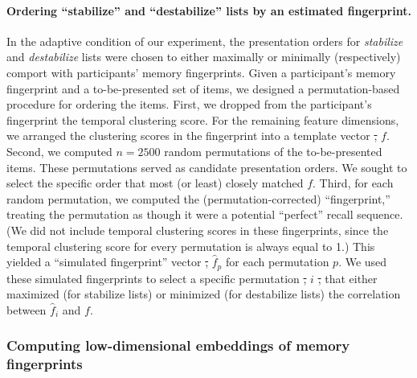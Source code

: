 \documentclass[11pt]{article}
\providecommand{\DIFdeltex}[1]{{\protect\color{red}\sout{#1}}}                      %
\providecommand{\DIFdelbegin}{} %
\providecommand{\DIFdelend}{} %
\providecommand{\DIFdel}[1]{\texorpdfstring{\DIFdeltex{#1}}{}} %
\newcommand{\DIFscaledelfig}{0.5}
\newlength{\DIFdelgraphicswidth} %
\newlength{\DIFdelgraphicsheight} %
\newcommand{\DIFdelincludegraphics}[2][]{%
\sbox{\DIFdelgraphicsbox}{\DIFOincludegraphics[#1]{#2}}%
\settoboxwidth{\DIFdelgraphicswidth}{\DIFdelgraphicsbox} %
\settoboxtotalheight{\DIFdelgraphicsheight}{\DIFdelgraphicsbox} %
\scalebox{\DIFscaledelfig}{%
\parbox[b]{\DIFdelgraphicswidth}{\usebox{\DIFdelgraphicsbox}\\[-\baselineskip] \rule{\DIFdelgraphicswidth}{0em}}\llap{\resizebox{\DIFdelgraphicswidth}{\DIFdelgraphicsheight}{%
\setlength{\unitlength}{\DIFdelgraphicswidth}%
\begin{picture}(1,1)%
\thicklines\linethickness{2pt} %
{\color[rgb]{1,0,0}\put(0,0){\framebox(1,1){}}}%
{\color[rgb]{1,0,0}\put(0,0){\line( 1,1){1}}}%
{\color[rgb]{1,0,0}\put(0,1){\line(1,-1){1}}}%
\end{picture}%
}\hspace*{3pt}}} %
} %
\DeclareRobustCommand{\DIFdelbegin}{\DIFOdelbegin \let\includegraphics\DIFdelincludegraphics} %
\DeclareRobustCommand{\DIFdelend}{\DIFOaddend \let\includegraphics\DIFOincludegraphics} %
\begin{document}
\paragraph{Ordering ``stabilize'' and ``destabilize'' lists by an estimated
fingerprint.}

In the adaptive condition of our experiment, the presentation orders for
\textit{stabilize} and \textit{destabilize} lists were chosen to either
maximally or minimally (respectively) comport with participants' memory
fingerprints. Given a participant's memory fingerprint and a to-be-presented
set of items, we designed a permutation-based procedure for ordering the items.
First, we dropped from the participant's fingerprint the temporal clustering
score. For the remaining feature dimensions, we arranged the clustering scores
in the fingerprint into a template vector \DIFdelbegin \DIFdel{, }\DIFdelend $f$. Second, we computed $n = 2500$
random permutations of the to-be-presented items. These permutations served as
candidate presentation orders. We sought to select the specific order that most
(or least) closely matched $f$. Third, for each random permutation, we computed
the (permutation-corrected) ``fingerprint,'' treating the permutation as though
it were a potential ``perfect'' recall sequence. (We did not include temporal
clustering scores in these fingerprints, since the temporal clustering score
for every permutation is always equal to 1.) This yielded a ``simulated
fingerprint'' vector \DIFdelbegin \DIFdel{, }\DIFdelend $\hat{f}_p$ for each permutation $p$. We used these
simulated fingerprints to select a specific permutation \DIFdelbegin \DIFdel{, }\DIFdelend $i$ \DIFdelbegin \DIFdel{, }\DIFdelend that either
maximized (for stabilize lists) or minimized (for destabilize lists) the
correlation between $\hat{f}_i$ and $f$.

\subsubsection*{Computing low-dimensional embeddings of memory fingerprints}
\end{document}
